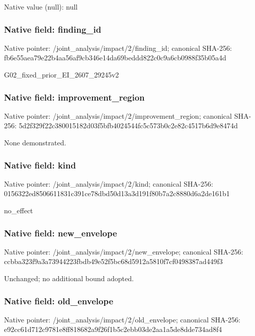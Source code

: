 \documentclass[10pt,a4paper]{article}
\begin{document}
Native value (null): null

\subsubsection{Native field: finding\_\allowbreak{}id}
Native pointer: /joint\_\allowbreak{}analysis/impact/2/finding\_\allowbreak{}id; canonical SHA-256: fb6e55aea79e22b4aa56af9cb346e14da69beddd822c0c9a6cb0988f35b05a4d

\begingroup\raggedright\sloppy G02\_\allowbreak{}fixed\_\allowbreak{}prior\_\allowbreak{}EI\_\allowbreak{}2607\_\allowbreak{}29245v2\par\endgroup

\subsubsection{Native field: improvement\_\allowbreak{}region}
Native pointer: /joint\_\allowbreak{}analysis/impact/2/improvement\_\allowbreak{}region; canonical SHA-256: 5d2f329f22c380015182d03f5bfb4024544fc5c573b0c2e82c4517b6d9e8474d

\begingroup\raggedright\sloppy None demonstrated.\par\endgroup

\subsubsection{Native field: kind}
Native pointer: /joint\_\allowbreak{}analysis/impact/2/kind; canonical SHA-256: 0156322ed8506611831c391ce78dbd50d13a3d191f80b7a2c8880d6a2de161b1

\begingroup\raggedright\sloppy no\_\allowbreak{}effect\par\endgroup

\subsubsection{Native field: new\_\allowbreak{}envelope}
Native pointer: /joint\_\allowbreak{}analysis/impact/2/new\_\allowbreak{}envelope; canonical SHA-256: ccbba323f9a3a73944223fbdb49e52f5bc68d5912a5810f7cf0498387ad449f3

\begingroup\raggedright\sloppy Unchanged;\allowbreak{} no additional bound adopted.\par\endgroup

\subsubsection{Native field: old\_\allowbreak{}envelope}
Native pointer: /joint\_\allowbreak{}analysis/impact/2/old\_\allowbreak{}envelope; canonical SHA-256: e92cc61d712c9781e8ff818682a9f26f1b5c2ebb03de2aa1a5de8dde734ad8f4
\end{document}
